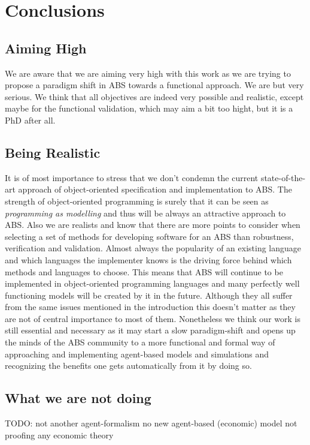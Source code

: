 \chapter{Conclusions}
\label{chap:concl}


\section{Aiming High}
We are aware that we are aiming very high with this work as we are trying to propose a paradigm shift in ABS towards a functional approach. We are but very serious. We think that all objectives are indeed very possible and realistic, except maybe for the functional validation, which may aim a bit too hight, but it is a PhD after all. 

\section{Being Realistic}
It is of most importance to stress that we don't condemn the current state-of-the-art approach of object-oriented specification and implementation to ABS. The strength of object-oriented programming is surely that it can be seen as \textit{programming as modelling} and thus will be always an attractive approach to ABS. Also we are realists and know that there are more points to consider when selecting a set of methods for developing software for an ABS than robustness, verification and validation. Almost always the popularity of an existing language and which languages the implementer knows is the driving force behind which methods and languages to choose. This means that ABS will continue to be implemented in object-oriented programming languages and many perfectly well functioning models will be created by it in the future. Although they all suffer from the same issues mentioned in the introduction this doesn't matter as they are not of central importance to most of them.
Nonetheless we think our work is still essential and necessary as it may start a slow paradigm-shift and opens up the minds of the ABS community to a more functional and formal way of approaching and implementing agent-based models and simulations and recognizing the benefits one gets automatically from it by doing so.

\section{What we are not doing}
TODO:
not another agent-formalism
no new agent-based (economic) model
not proofing any economic theory